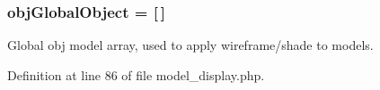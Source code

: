 \hypertarget{model__display_8php_ac5a54459373100893f6d7cda55df4463}{
\subsubsection[{obj\-Global\-Object}]{\setlength{\rightskip}{0pt plus 5cm}obj\-Global\-Object = \mbox{[}$\,$\mbox{]}}}\label{model__display_8php_ac5a54459373100893f6d7cda55df4463}
Global obj model array, used to apply wireframe/shade to models. 

Definition at line 86 of file model\-\_\-display.\-php.

